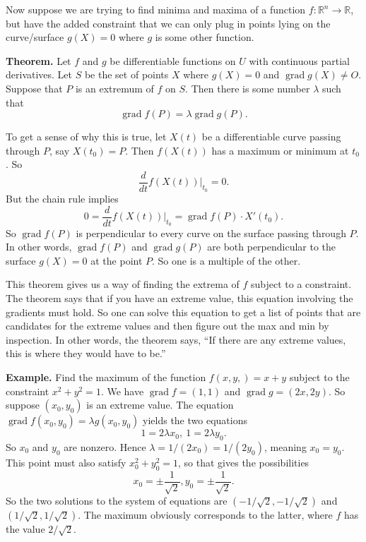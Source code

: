 \documentclass{article}
\DeclareMathOperator{\grd}{grad}
\begin{document}
Now suppose we are trying to find minima and maxima of a function
$f:\mathbb{R}^n \to \mathbb{R}$, but have the added constraint
that we can only plug in points lying on the curve/surface $g(X)=0$
where $g$ is some other function.

\textbf{Theorem.} Let $f$ and $g$ be differentiable functions on $U$ with
continuous partial derivatives. Let $S$ be the set of points $X$
where $g(X)=0$ and $\grd g(X) \neq O$. Suppose that $P$ is 
an extremum of $f$ on $S$. Then there is some number $\lambda$ such that
\[\grd f(P) = \lambda \grd g(P).\]

To get a sense of why this is true, let $X(t)$ be a 
differentiable curve passing through $P$, say $X(t_0)=P$.
Then $f(X(t))$ has a maximum or minimum at $t_0$. So 
\[\frac{d}{dt} f(X(t)) \bigg\vert_{t_0} =0.\]
But the chain rule implies
\[0=\frac{d}{dt} f(X(t)) \bigg\vert_{t_0} = \grd f(P) \cdot X'(t_0).\]
So $\grd f(P)$ is perpendicular to every curve on the surface
passing through $P$. In other words, $\grd f(P)$ and $\grd g(P)$
are both perpendicular to the surface $g(X)=0$ at the point $P$.
So one is a multiple of the other.

This theorem gives us a way of finding the extrema of $f$ subject to
a constraint. The theorem says that if you have an extreme value,
this equation involving the gradients must hold. So one can solve this equation
to get a list of points that are candidates for the extreme values and then figure out the
max and min by inspection. In other words, the theorem says, 
``If there are any extreme values, this is where they would have to be.''

\textbf{Example.} Find the maximum of the function $f(x,y,)=x+y$
subject to the constraint $x^2 + y^2 = 1$. We have $\grd f = (1,1)$
and $\grd g = (2x,2y)$. So suppose $(x_0,y_0)$ is an extreme value.
The equation $\grd f(x_0,y_0)  = \lambda g(x_0,y_0)$ yields the 
two equations
\[1=2\lambda x_0,\ 1 = 2\lambda y_0.\]
So $x_0$ and $y_0$ are nonzero. Hence $\lambda = 1/(2x_0) = 1/(2y_0)$,
meaning $x_0 = y_0$. This point must also satisfy $x_0^2 + y_0^2 = 1$,
so that gives the possibilities 
\[x_0 = \pm \frac{1}{\sqrt{2}}, y_0 = \pm \frac{1}{\sqrt{2}}.\]
So the two solutions to the system of equations are $(-1/\sqrt{2},-1/\sqrt{2})$
and $(1/\sqrt{2},1/\sqrt{2})$. The maximum obviously corresponds to the
latter, where $f$ has the value $2/\sqrt{2}$.
\end{document}
